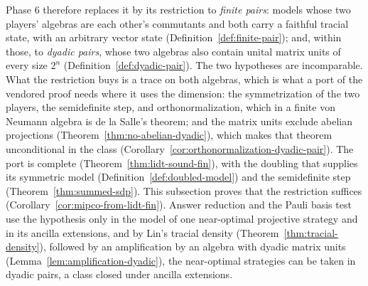 Phase 6 therefore replaces it by its restriction to \emph{finite pairs}: models whose two players'
algebras are each other's commutants and both carry a faithful tracial state, with an arbitrary
vector state (Definition~\ref{def:finite-pair}); and, within those, to \emph{dyadic pairs}, whose two
algebras also contain unital matrix units of every size $2^n$ (Definition~\ref{def:dyadic-pair}). The
two hypotheses are incomparable. What the restriction buys is a trace on both algebras, which is what
a port of the vendored proof needs where it uses the dimension: the symmetrization of the two
players, the semidefinite step, and orthonormalization, which in a finite von Neumann algebra is de
la Salle's theorem; and the matrix units exclude abelian projections
(Theorem~\ref{thm:no-abelian-dyadic}), which makes that theorem unconditional in the class
(Corollary~\ref{cor:orthonormalization-dyadic-pair}). The port is complete
(Theorem~\ref{thm:lidt-sound-fin}), with the doubling that supplies its symmetric model
(Definition~\ref{def:doubled-model}) and the semidefinite step (Theorem~\ref{thm:summed-sdp}). This
subsection
proves that the restriction suffices (Corollary~\ref{cor:mipco-from-lidt-fin}). Answer reduction and
the Pauli basis test use the hypothesis only in the model of one near-optimal projective strategy
and in its ancilla extensions, and by Lin's tracial density (Theorem~\ref{thm:tracial-density}),
followed by an amplification by an algebra with dyadic matrix units
(Lemma~\ref{lem:amplification-dyadic}), the near-optimal strategies can be taken in dyadic pairs, a
class closed under ancilla extensions.

